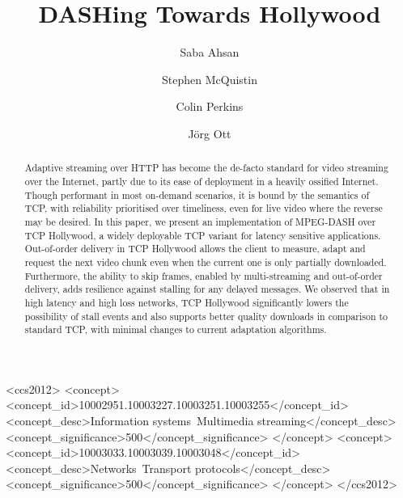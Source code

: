 \documentclass[sigconf]{acmart}
\begin{document}
\title{DASHing Towards Hollywood}


\author{Saba Ahsan}

\author{Stephen McQuistin}

\author{Colin Perkins}

\author{J\"org Ott}

\renewcommand{\shortauthors}{S. Ahsan, S. McQuistin, C. Perkins, and J. Ott}


\begin{abstract}
Adaptive streaming over HTTP has become the de-facto standard for video streaming over the
Internet, partly due to its ease of deployment in a heavily ossified Internet. Though
performant in most on-demand scenarios, it is bound by the semantics of TCP, with
reliability prioritised over timeliness, even for live video where the reverse may be
desired. In this paper, we present an implementation of MPEG-DASH over TCP Hollywood, a
widely deployable TCP variant for latency sensitive applications. Out-of-order delivery
in TCP Hollywood allows the client to measure, adapt and request the
next video chunk even when the current one is only partially downloaded. Furthermore, the
ability to skip frames, enabled by multi-streaming and out-of-order delivery, adds resilience against stalling 
for any delayed messages. We observed
that in high latency and high loss networks, TCP Hollywood significantly
lowers the possibility of stall events and also supports better quality downloads in
comparison to standard TCP, with minimal changes to current adaptation algorithms. 
\end{abstract}


\begin{CCSXML}
<ccs2012>
<concept>
<concept_id>10002951.10003227.10003251.10003255</concept_id>
<concept_desc>Information systems~Multimedia streaming</concept_desc>
<concept_significance>500</concept_significance>
</concept>
<concept>
<concept_id>10003033.10003039.10003048</concept_id>
<concept_desc>Networks~Transport protocols</concept_desc>
<concept_significance>500</concept_significance>
</concept>
</ccs2012>
\end{CCSXML}
\end{document}

